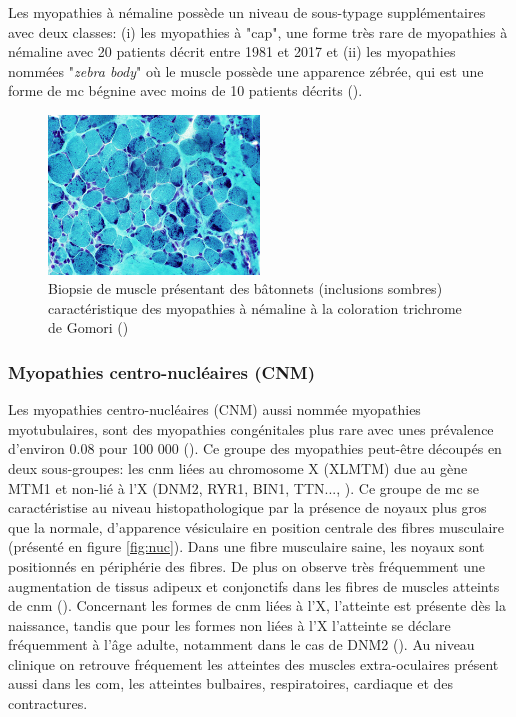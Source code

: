 Les myopathies à némaline possède un niveau de sous-typage supplémentaires avec deux classes: (i) les myopathies à "cap", une forme très rare de myopathies à némaline avec 20 patients décrit entre 1981 et 2017 et (ii) les myopathies nommées "\textit{zebra body}" où le muscle possède une apparence zébrée, qui est une forme de \gls{mc} bégnine avec moins de 10 patients décrits (\cite{cassandrini_congenital_2017}).
\begin{figure}[!ht]
 \centering
 \includegraphics[width=0.5\textwidth]{figures/rods.jpg}
 \caption[Biopsie de muscle de myopathies à némaline]{Biopsie de muscle présentant des bâtonnets (inclusions sombres) caractéristique des myopathies à némaline à la coloration trichrome de Gomori (\cite{alan_pestronk_neuromuscular_2022})}
 \label{fig:rods}
\end{figure}



\subsubsection{Myopathies centro-nucléaires (CNM)}
Les myopathies centro-nucléaires  (CNM) aussi nommée myopathies myotubulaires, sont des myopathies congénitales plus rare avec unes prévalence d'environ 0.08 pour 100 000 (\cite{huang_systematic_2021}). Ce groupe des myopathies peut-être découpés en deux sous-groupes: les \gls{cnm} liées au chromosome X (XLMTM) due au gène MTM1 et non-lié à l'X (DNM2, RYR1, BIN1, TTN..., \cite{north_approach_2014}). Ce groupe de \gls{mc} se caractéristise au niveau histopathologique par la présence de noyaux plus gros que la normale, d'apparence vésiculaire en position centrale des fibres musculaire (présenté en figure \ref{fig:nuc}). Dans une fibre musculaire saine, les noyaux sont positionnés en périphérie des fibres. De plus on observe très fréquemment une augmentation de tissus adipeux et conjonctifs dans les fibres de muscles atteints de \gls{cnm} (\cite{jungbluth_congenital_2018}). Concernant les formes de \gls{cnm} liées à l'X, l'atteinte est présente dès la naissance, tandis que pour les formes non liées à l'X l'atteinte se déclare fréquemment à l'âge adulte, notamment dans le cas de DNM2 (\cite{jungbluth_congenital_2018}). Au niveau clinique on retrouve fréquement les atteintes des muscles extra-oculaires présent aussi dans les \gls{com}, les atteintes bulbaires, respiratoires, cardiaque et des contractures. 

